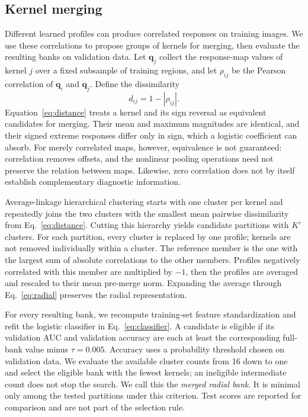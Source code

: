 \documentclass[10pt,twocolumn]{article}
\begin{document}
\subsection{Kernel merging}
\label{sec:merge}
Different learned profiles can produce correlated responses on training images. We use these correlations to propose groups of kernels for merging, then evaluate the resulting banks on validation data. Let $\mathbf q_j$ collect the response-map values of kernel $j$ over a fixed subsample of training regions, and let $\rho_{ij}$ be the Pearson correlation of $\mathbf q_i$ and $\mathbf q_j$. Define the dissimilarity
\begin{equation}
d_{ij}=1-|\rho_{ij}|.
\label{eq:distance}
\end{equation}
Equation~\eqref{eq:distance} treats a kernel and its sign reversal as equivalent candidates for merging. Their mean and maximum magnitudes are identical, and their signed extreme responses differ only in sign, which a logistic coefficient can absorb. For merely correlated maps, however, equivalence is not guaranteed: correlation removes offsets, and the nonlinear pooling operations need not preserve the relation between maps. Likewise, zero correlation does not by itself establish complementary diagnostic information.

Average-linkage hierarchical clustering starts with one cluster per kernel and repeatedly joins the two clusters with the smallest mean pairwise dissimilarity from Eq.~\eqref{eq:distance}. Cutting this hierarchy yields candidate partitions with $K'$ clusters. For each partition, every cluster is replaced by one profile; kernels are not removed individually within a cluster. The reference member is the one with the largest sum of absolute correlations to the other members. Profiles negatively correlated with this member are multiplied by $-1$, then the profiles are averaged and rescaled to their mean pre-merge norm. Expanding the average through Eq.~\eqref{eq:radial} preserves the radial representation.

For every resulting bank, we recompute training-set feature standardization and refit the logistic classifier in Eq.~\eqref{eq:classifier}. A candidate is eligible if its validation AUC and validation accuracy are each at least the corresponding full-bank value minus $\tau=0.005$. Accuracy uses a probability threshold chosen on validation data. We evaluate the available cluster counts from 16 down to one and select the eligible bank with the fewest kernels; an ineligible intermediate count does not stop the search. We call this the \emph{merged radial bank}. It is minimal only among the tested partitions under this criterion. Test scores are reported for comparison and are not part of the selection rule.
\end{document}
